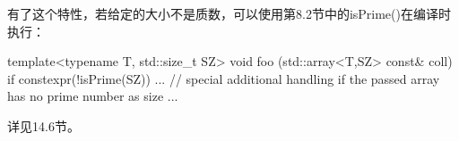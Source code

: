 有了这个特性，若给定的大小不是质数，可以使用第8.2节中的isPrime()在编译时执行：

\begin{cpp}
template<typename T, std::size_t SZ>
void foo (std::array<T,SZ> const& coll)
{
	if constexpr(!isPrime(SZ)) {
		... // special additional handling if the passed array has no prime number as size
	}
	...
}
\end{cpp}

详见14.6节。



























